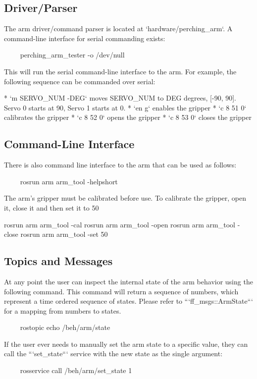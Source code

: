 \documentclass{article}
\begin{document}
\subsection{Driver/Parser}
\begin{markdown}
The arm driver/command parser is located at `hardware/perching_arm`. A command-line interface for serial commanding exists:

~~~~
perching_arm_tester -o /dev/null
~~~~

This will run the serial command-line interface to the arm. For example, the following sequence can be commanded over serial:

* `m SERVO_NUM -DEG` moves SERVO_NUM to DEG degrees, [-90, 90]. Servo 0 starts at 90, Servo 1 starts at 0.
* `en g` enables the gripper
* `c 8 51 0` calibrates the gripper
* `c 8 52 0` opens the gripper
* `c 8 53 0` closes the gripper
\end{markdown}

\subsection{Command-Line Interface}
\begin{markdown}
There is also command line interface to the arm that can be used as follows:

~~~~
rosrun arm arm_tool -helpshort
~~~~

The arm's gripper must be calibrated before use. To calibrate the gripper, open it, close it and then set it to 50%

    rosrun arm arm_tool -cal
    rosrun arm arm_tool -open
    rosrun arm arm_tool -close
    rosrun arm arm_tool -set 50
\end{markdown}


\subsection{Topics and Messages}

\begin{markdown}
At any point the user can inspect the internal state of the arm behavior using the following command. This command will return a sequence of numbers, which represent a time ordered sequence of states. Please refer to ```ff_msgs::ArmState``` for a mapping from numbers to states.

~~~~
rostopic echo /beh/arm/state
~~~~

If the user ever needs to manually set the arm state to a specific value, they can call the ```set_state``` service with the new state as the single argument:

~~~~
rosservice call /beh/arm/set_state 1
~~~~
\end{markdown}
\end{document}
